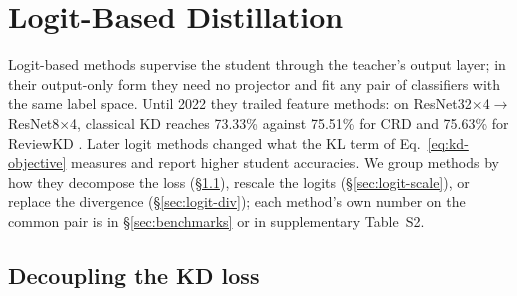 \section{Logit-Based Distillation}
\label{sec:logit}

Logit-based methods supervise the student through the teacher's output layer; in their output-only form they need no projector and fit any pair of classifiers with the same label space. Until 2022 they trailed feature methods: on ResNet32$\times$4$\to$ResNet8$\times$4, classical KD \citep{hinton2015kd} reaches 73.33\% against 75.51\% for CRD and 75.63\% for ReviewKD \citep[Table~6]{zhao2022dkd}.
Later logit methods changed what the KL term of Eq.~\eqref{eq:kd-objective} measures and report higher student accuracies. We group methods by how they decompose the loss (\S\ref{sec:logit-decouple}), rescale the logits (\S\ref{sec:logit-scale}), or replace the divergence (\S\ref{sec:logit-div}); each method's own number on the common pair is in \S\ref{sec:benchmarks} or in supplementary Table~S2.

\subsection{Decoupling the KD loss}
\label{sec:logit-decouple}

